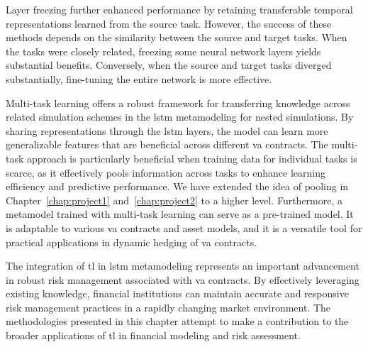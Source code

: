 Layer freezing further enhanced performance by retaining transferable temporal representations learned from the source task. 
However, the success of these methods depends on the similarity between the source and target tasks. 
When the tasks were closely related, freezing some neural network layers yields substantial benefits. 
Conversely, when the source and target tasks diverged substantially, fine-tuning the entire network is more effective.

Multi-task learning offers a robust framework for transferring knowledge across related simulation schemes in the \gls{lstm} metamodeling for nested simulations. 
By sharing representations through the \gls{lstm} layers, the model can learn more generalizable features that are beneficial across different \gls{va} contracts. 
The multi-task approach is particularly beneficial when training data for individual tasks is scarce, as it effectively pools information across tasks to enhance learning efficiency and predictive performance.
We have extended the idea of pooling in Chapter~\ref{chap:project1} and~\ref{chap:project2} to a higher level.
Furthermore, a metamodel trained with multi-task learning can serve as a pre-trained model. 
It is adaptable to various \gls{va} contracts and asset models, and it is a versatile tool for practical applications in dynamic hedging of \gls{va} contracts.

The integration of \gls{tl} in \gls{lstm} metamodeling represents an important advancement in robust risk management associated with \gls{va} contracts.
By effectively leveraging existing knowledge, financial institutions can maintain accurate and responsive risk management practices in a rapidly changing market environment. 
The methodologies presented in this chapter attempt to make a contribution to the broader applications of \gls{tl} in financial modeling and risk assessment.

